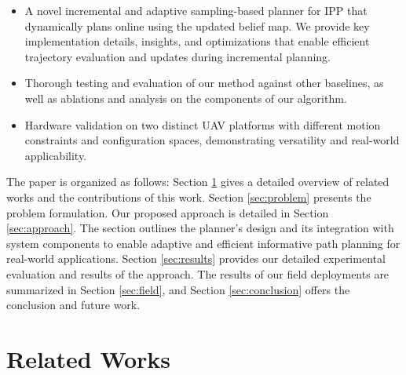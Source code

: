 

\begin{itemize}
    \item A novel incremental and adaptive sampling-based planner for IPP that dynamically plans online using the updated belief map. We provide key implementation details, insights, and optimizations that enable efficient trajectory evaluation and updates during incremental planning.
    \item Thorough testing and evaluation of our method against other baselines, as well as ablations and analysis on the components of our algorithm.
    \item Hardware validation on two distinct UAV platforms with different motion constraints and configuration spaces, demonstrating versatility and real-world applicability.
\end{itemize}

The paper is organized as follows: Section \ref{sec:related} gives a detailed overview of related works and the contributions of this work. Section \ref{sec:problem} presents the problem formulation. Our proposed approach is detailed in Section \ref{sec:approach}. The section outlines the planner's design and its integration with system components to enable adaptive and efficient informative path planning for real-world applications. Section \ref{sec:results} provides our detailed experimental evaluation and results of the approach. The results of our field deployments are summarized in Section \ref{sec:field}, and Section \ref{sec:conclusion} offers the conclusion and future work. 


\section{Related Works}\label{sec:related}


